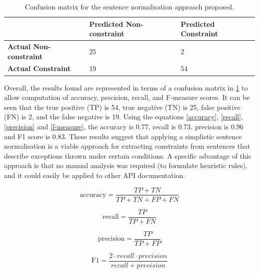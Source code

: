 \begin{table}[h]
	\centering
	\begin{tabular}{l|l|l|}
		\cline{2-3}
		& \textbf{Predicted Non-constraint} & \textbf{Predicted Constraint} \\ \hline
		\multicolumn{1}{|l|}{\textbf{Actual Non-constraint}} & 25 & 2 \\ \hline
		\multicolumn{1}{|l|}{\textbf{Actual Constraint}} & 19 & 54 \\ \hline
	\end{tabular}
	\caption{Confusion matrix for the sentence normalisation approach proposed.}
	\label{tab:conf-mat}
\end{table}

Overall, the results found are represented in terms of a confusion matrix in \ref{tab:conf-mat} to allow computation of accuracy, precision, recall, and F-measure scores. It can be seen that the true positive (TP) is 54, true negative (TN) is 25, false positive (FN) is 2, and the false negative is 19. Using the equations \ref{accuracy}, \ref{recall}, \ref{precision} and \ref{f-measure}, the accuracy is 0.77, recall is 0.73, precision is 0.96 and F1 score is 0.83. These results suggest that applying a simplistic sentence normalisation is a viable approach for extracting constraints from sentences that describe exceptions thrown under certain conditions. A specific advantage of this approach is that no manual analysis was required (to formulate heuristic rules), and it could easily be applied to other API documentation.

\begin{equation}
\label{accuracy}
\text{accuracy} = \frac{TP + TN}{TP + TN + FP + FN}
\end{equation}

\begin{equation}
\label{recall}
\text{recall}=\frac{TP}{TP + FN}
\end{equation}

\begin{equation}
\label{precision}
\text{precision}=\frac{TP}{TP + FP}
\end{equation}

\begin{equation}
\label{f-measure}
\text{F1}=\frac{2\cdot recall\cdot precision}{recall + precision}
\end{equation}

